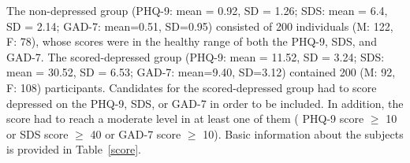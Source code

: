 \documentclass[10pt,twocolumn,letterpaper]{article}
\begin{document}
\begin{table}[]
\caption{The scoring criteria of the selected subjects}
\label{scale}
\end{table}

The non-depressed group (PHQ-9: mean = 0.92, SD = 1.26; SDS: mean = 6.4, SD = 2.14; GAD-7: mean=0.51, SD=0.95) consisted of 200 individuals
(M: 122, F: 78), whose scores were in the healthy range of both the PHQ-9, SDS, and GAD-7.
The scored-depressed group (PHQ-9: mean = 11.52, SD = 3.24; SDS: mean = 30.52, SD = 6.53; GAD-7: mean=9.40, SD=3.12) contained 200 (M: 92, F: 108) participants.
Candidates for the scored-depressed group had to score depressed on the PHQ-9, SDS, or GAD-7 in order to be included.
In addition, the score had to reach a moderate level in at least one of them ( PHQ-9 score $\geq$ 10 or SDS score $\geq$ 40 or GAD-7 score $\geq$ 10).
Basic information about the subjects is provided in Table~\ref{score}.
\end{document}
